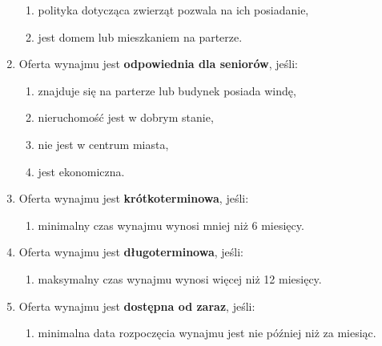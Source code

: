 \begin{enumerate}[label=W\arabic*.]
    \begin{enumerate}[label=\arabic*.]
        \item polityka dotycząca zwierząt pozwala na ich posiadanie,
        \item jest domem lub mieszkaniem na parterze.
    \end{enumerate}
    \item Oferta wynajmu jest \textbf{odpowiednia dla seniorów}, jeśli:
    \begin{enumerate}[label=\arabic*.]
        \item znajduje się na parterze lub budynek posiada windę,
        \item nieruchomość jest w dobrym stanie,
        \item nie jest w centrum miasta,
        \item jest ekonomiczna.
    \end{enumerate}
    \item Oferta wynajmu jest \textbf{krótkoterminowa}, jeśli:
    \begin{enumerate}[label=\arabic*.]
        \item minimalny czas wynajmu wynosi mniej niż 6 miesięcy.
    \end{enumerate}
    \item Oferta wynajmu jest \textbf{długoterminowa}, jeśli:
    \begin{enumerate}[label=\arabic*.]
        \item maksymalny czas wynajmu wynosi więcej niż 12 miesięcy.
    \end{enumerate}
    \item Oferta wynajmu jest \textbf{dostępna od zaraz}, jeśli:
    \begin{enumerate}[label=\arabic*.]
        \item minimalna data rozpoczęcia wynajmu jest nie później niż za miesiąc.
    \end{enumerate}
\end{enumerate}


